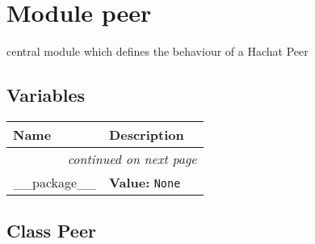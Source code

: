 %
%
%


\section{Module peer}

    \label{peer}
central module which defines the behaviour of a Hachat Peer



  \subsection{Variables}

    \vspace{-1cm}
\hspace{\varindent}\begin{longtable}{|p{\varnamewidth}|p{\vardescrwidth}|l}
\cline{1-2}
\cline{1-2} \centering \textbf{Name} & \centering \textbf{Description}& \\
\cline{1-2}
\endhead\cline{1-2}\multicolumn{3}{r}{\small\textit{continued on next page}}\\\endfoot\cline{1-2}
\endlastfoot\raggedright \_\-\_\-p\-a\-c\-k\-a\-g\-e\-\_\-\_\- & \raggedright \textbf{Value:} 
{\tt None}&\\
\cline{1-2}
\end{longtable}



\subsection{Class Peer}

